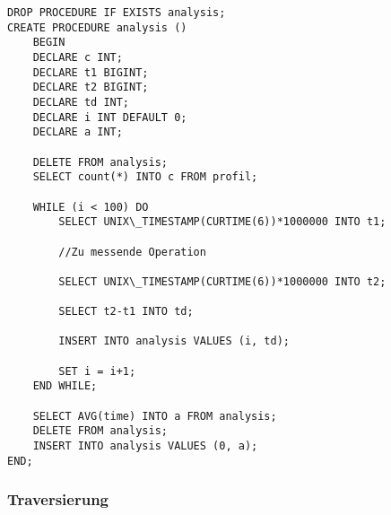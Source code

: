 \begin{lstlisting}
DROP PROCEDURE IF EXISTS analysis;
CREATE PROCEDURE analysis ()
	BEGIN
	DECLARE c INT;
	DECLARE t1 BIGINT;
	DECLARE t2 BIGINT;
	DECLARE td INT;
	DECLARE i INT DEFAULT 0;
	DECLARE a INT;
		
	DELETE FROM analysis;
	SELECT count(*) INTO c FROM profil;
		
	WHILE (i < 100) DO
		SELECT UNIX\_TIMESTAMP(CURTIME(6))*1000000 INTO t1;
		
		//Zu messende Operation
		
		SELECT UNIX\_TIMESTAMP(CURTIME(6))*1000000 INTO t2;
		
		SELECT t2-t1 INTO td;
		
		INSERT INTO analysis VALUES (i, td);
		
		SET i = i+1;
	END WHILE;
	
	SELECT AVG(time) INTO a FROM analysis;
	DELETE FROM analysis;
	INSERT INTO analysis VALUES (0, a);
END;
\end{lstlisting}

\subsubsection{Traversierung}
